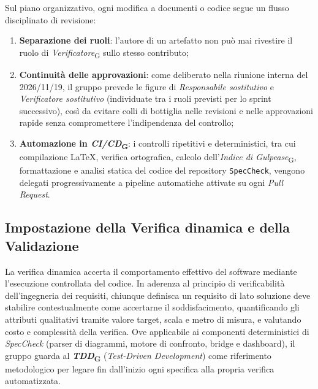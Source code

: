 \documentclass[11pt, a4paper]{article}
\newcommand{\glossario}[1]{\textit{#1}\textsubscript{G}}
\begin{document}
Sul piano organizzativo, ogni modifica a documenti o codice segue un flusso disciplinato di revisione:
\begin{enumerate}
    \item \textbf{Separazione dei ruoli}: l'autore di un artefatto non può mai rivestire il ruolo di \glossario{Verificatore} sullo stesso contributo;
    \item \textbf{Continuità delle approvazioni}: come deliberato nella riunione interna del 2026/11/19, il gruppo prevede le figure di \textit{Responsabile sostitutivo} e \textit{Verificatore sostitutivo} (individuate tra i ruoli previsti per lo sprint successivo), così da evitare colli di bottiglia nelle revisioni e nelle approvazioni rapide senza compromettere l'indipendenza del controllo;
    \item \textbf{Automazione in \glossario{CI/CD}}: i controlli ripetitivi e deterministici, tra cui compilazione \LaTeX{}, verifica ortografica, calcolo dell'\glossario{Indice di Gulpease}, formattazione e analisi statica del codice del repository \texttt{SpecCheck}, vengono delegati progressivamente a pipeline automatiche attivate su ogni \textit{Pull Request}.
\end{enumerate}

\subsection{Impostazione della Verifica dinamica e della Validazione}
La verifica dinamica accerta il comportamento effettivo del software mediante l'esecuzione controllata del codice. In aderenza al principio di verificabilità dell'ingegneria dei requisiti, chiunque definisca un requisito di lato soluzione deve stabilire contestualmente come accertarne il soddisfacimento, quantificando gli attributi qualitativi tramite valore target, scala e metro di misura, e valutando costo e complessità della verifica. Ove applicabile ai componenti deterministici di \textit{SpecCheck} (parser di diagrammi, motore di confronto, bridge e dashboard), il gruppo guarda al \textbf{\glossario{TDD}} (\textit{Test-Driven Development}) come riferimento metodologico per legare fin dall'inizio ogni specifica alla propria verifica automatizzata.
\end{document}

